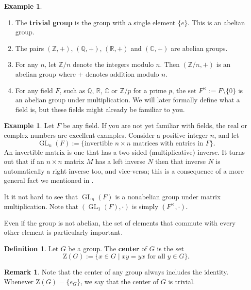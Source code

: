 \documentclass[12pt]{report}
\numberwithin{equation}{section}
\numberwithin{theorem}{chapter}
\theoremstyle{definition}
\newtheorem{definition}[theorem]{Definition}
\newtheorem{example}[theorem]{Example}
\newtheorem*{basic properties}{Basic Properties}
\newtheorem*{Important Remark}{Important Remark}
\newtheorem{remark}[theorem]{Remark}
\newcommand{\df}[1]{{\bf #1}\index{#1}}
\DeclareMathOperator{\GL}{GL}
\newcommand{\C}{\mathbb{C}}
\begin{document}
\begin{example}$\,$
\begin{enumerate}
\item The \df{trivial group} is the group with a single element $\{e\}$. This is an abelian group. 
\item  The pairs $(\mathbb{Z}, +)$, $(\mathbb{Q}, +)$, $(\mathbb{R}, +)$ and $(\C,+)$ are abelian groups. 
\item For any $n$, let $\mathbb{Z}/n$ denote the integers modulo $n$. Then $(\mathbb{Z}/n, +)$ is an abelian group where $+$ denotes addition modulo $n$.
\item For any field $F$, such as $\mathbb{Q}$, $\mathbb{R}$, $\C$ or $\mathbb{Z}/p$ for a prime $p$, the set $F^\times := F \setminus \{0\}$ is an abelian group under multiplication. We will later formally define what a field is, but these fields might already be familiar to you.
\end{enumerate}
\end{example}

\begin{example} 
Let $F$ be any field. If you are not yet familiar with fields, the real or complex numbers are excellent examples.  Consider a positive integer $n$, and let 
$$\GL_n(F) := \{ \text{invertible }  n \times n \text{ matrices with entries in } F \}.$$
An invertible matrix is one that has a two-sided (multiplicative) inverse. It turns out that if an $n \times n$ matrix $M$ has a left inverse $N$ then that inverse $N$ is automatically a right inverse too, and vice-versa; this is a consequence of a more general fact we mentioned in .

It it not hard to see that $\GL_n(F)$ is a nonabelian group under matrix multiplication. Note that $(\GL_1(F), \cdot)$ is simply $(F^\times, \cdot)$. 	
\end{example}


Even if the group is not abelian, the set of elements that commute with every other element is particularly important.


\begin{definition}
	Let $G$ be a group. The {\bf center} of $G$ is the set
	$$\mathrm{Z}(G) := \lbrace x \in G \mid xy = yx \textrm{ for all } y \in G \rbrace.$$
\end{definition}

\begin{remark}
	Note that the center of any group always includes the identity. Whenever $\mathrm{Z}(G) = \{ e_G \}$, we say that the center of $G$ is trivial.
\end{remark}
\end{document}
